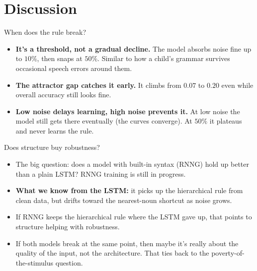 \section{Discussion}

\begin{frame}{When does the rule break?}
  \begin{itemize}
    \item \textbf{It's a threshold, not a gradual decline.} The model absorbs noise
      fine up to $10\%$, then snaps at $50\%$. Similar to how a child's grammar
      survives occasional speech errors around them.
    \item \textbf{The attractor gap catches it early.} It climbs from $0.07$ to $0.20$
      even while overall accuracy still looks fine.
    \item \textbf{Low noise delays learning, high noise prevents it.} At low noise
      the model still gets there eventually (the curves converge). At $50\%$ it
      plateaus and never learns the rule.
  \end{itemize}
\end{frame}

\begin{frame}{Does structure buy robustness?}
  \begin{itemize}
    \item The big question: does a model with built-in syntax (RNNG) hold up
      better than a plain LSTM? RNNG training is still in progress.
    \item \textbf{What we know from the LSTM:} it picks up the hierarchical rule
      from clean data, but drifts toward the nearest-noun shortcut as noise grows.
    \item If RNNG keeps the hierarchical rule where the LSTM gave up, that
      points to structure helping with robustness.
    \item If both models break at the same point, then maybe it's really about
      the quality of the input, not the architecture. That ties back to the
      poverty-of-the-stimulus question.
  \end{itemize}
\end{frame}

